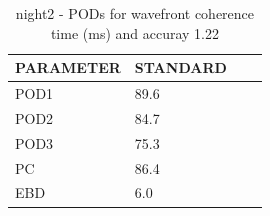 \begin{table}[p!]
\begin{center}
\begin{tabular}{|l|l|l|l|}
\hline
\multicolumn{1}{|c|}{\cellcolor[HTML]{C0C0C0}\textbf{PARAMETER}} & \multicolumn{1}{c|}{\cellcolor[HTML]{C0C0C0}\textbf{STANDARD}} \\
\hline
\cellcolor[HTML]{C0C0C0}POD1  & 89.6                                \\
\cellcolor[HTML]{C0C0C0}POD2  & 84.7                                \\
\cellcolor[HTML]{C0C0C0}POD3  & 75.3                                \\
\cellcolor[HTML]{C0C0C0}PC    & 86.4                                  \\
\cellcolor[HTML]{C0C0C0}EBD   & 6.0                                 \\
\hline
\end{tabular}
\caption{night2 - PODs for wavefront coherence time (ms) and accuray 1.22}
\label{tab:podtau1.22:night2}
\end{center}
\end{table}
